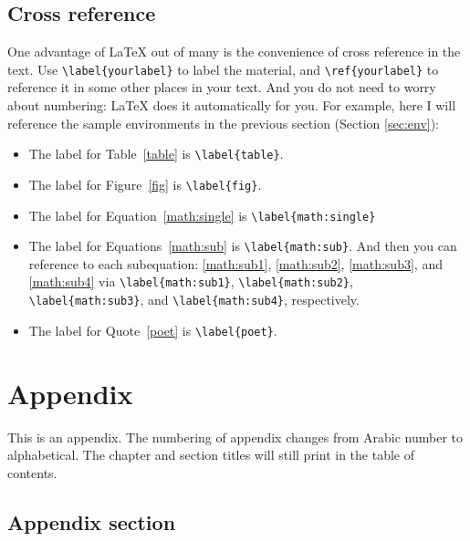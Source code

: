\documentclass[final]{emory}
\begin{document}
\section{Cross reference}
One advantage of \LaTeX{} out of many is the convenience of cross reference in
the text. Use \Verb|\label{yourlabel}| to label the material, and \Verb|\ref{yourlabel}|
to reference it in some other places in your text. And you do not need to worry
about numbering: \LaTeX{} does it automatically for you. For example, here
I will reference the sample environments in the previous section (Section 
\ref{sec:env}):
\begin{itemize}
\item The label for Table~\ref{table} is \Verb|\label{table}|.
\item The label for Figure~\ref{fig} is \Verb|\label{fig}|.
\item The label for Equation~\ref{math:single} is \Verb|\label{math:single}|
\item The label for Equations~\ref{math:sub} is \Verb|\label{math:sub}|. And then
      you can reference to each subequation: \ref{math:sub1}, \ref{math:sub2}, 
      \ref{math:sub3}, and \ref{math:sub4} via \Verb|\label{math:sub1}|,
      \Verb|\label{math:sub2}|, \Verb|\label{math:sub3}|, and \Verb|\label{math:sub4}|,
      respectively.
\item The label for Quote~\ref{poet} is \Verb|\label{poet}|.
\end{itemize}


\appendix
\renewcommand{\chaptername}{Appendix}

\chapter{Appendix}
This is an appendix. The numbering of appendix changes from Arabic number to 
alphabetical.
The chapter and section titles will still print in the table of contents.

\section{Appendix section}
\end{document}
